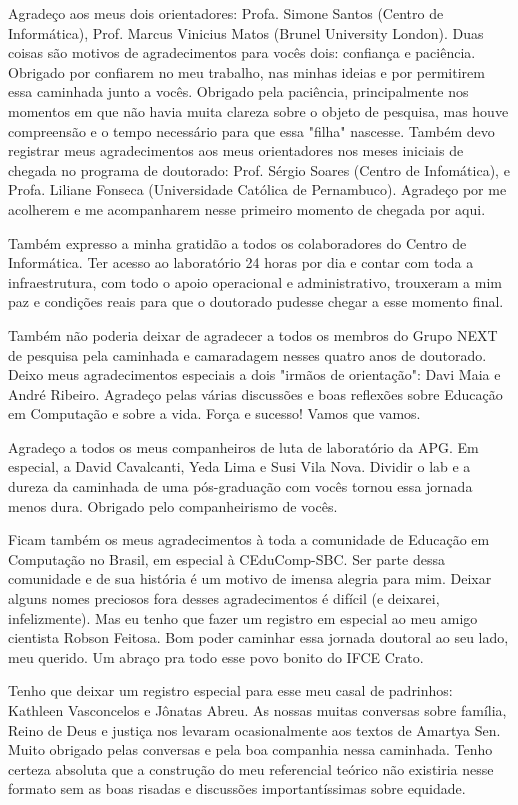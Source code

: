 \begin{agradecimentos}
Agradeço aos meus dois orientadores: Profa. Simone Santos (Centro de Informática), Prof. Marcus Vinicius Matos (Brunel University London). Duas coisas são motivos de agradecimentos para vocês dois: confiança e paciência. Obrigado por confiarem no meu trabalho, nas minhas ideias e por permitirem essa caminhada junto a vocês. Obrigado pela paciência, principalmente nos momentos em que não havia muita clareza sobre o objeto de pesquisa, mas houve compreensão e o tempo necessário para que essa "filha" nascesse. Também devo registrar meus agradecimentos aos meus orientadores nos meses iniciais de chegada no programa de doutorado:  Prof. Sérgio Soares (Centro de Infomática), e Profa. Liliane Fonseca (Universidade Católica de Pernambuco). Agradeço por me acolherem e me acompanharem nesse primeiro momento de chegada por aqui.

Também expresso a minha gratidão a todos os colaboradores do Centro de Informática. 
Ter acesso ao laboratório 24 horas por dia e contar com toda a infraestrutura, com todo o apoio operacional e administrativo, trouxeram a mim paz e condições reais para que o doutorado pudesse chegar a esse momento final.

Também não poderia deixar de agradecer a todos os membros do Grupo NEXT de pesquisa pela caminhada e camaradagem nesses quatro anos de doutorado. Deixo meus agradecimentos especiais a dois "irmãos de orientação": Davi Maia e André Ribeiro. Agradeço pelas várias discussões e boas reflexões sobre Educação em Computação e sobre a vida. Força e sucesso! Vamos que vamos.

Agradeço a todos os meus companheiros de luta de laboratório da APG. Em especial, a David Cavalcanti, Yeda Lima e Susi Vila Nova. Dividir o lab e a dureza da caminhada de uma pós-graduação com vocês tornou essa jornada menos dura. Obrigado pelo companheirismo de vocês.

Ficam também os meus agradecimentos à toda a comunidade de Educação em Computação no Brasil, em especial à CEduComp-SBC. Ser parte dessa comunidade e de sua história é um motivo de imensa alegria para mim. Deixar alguns nomes preciosos fora desses agradecimentos é difícil (e deixarei, infelizmente). Mas eu tenho que fazer um registro em especial ao meu amigo cientista Robson Feitosa. Bom poder caminhar essa jornada doutoral ao seu lado, meu querido. Um abraço pra todo esse povo bonito do IFCE Crato.

Tenho que deixar um registro especial para esse meu casal de padrinhos: Kathleen Vasconcelos e Jônatas Abreu. As nossas muitas conversas sobre família, Reino de Deus e justiça nos levaram ocasionalmente aos textos de Amartya Sen. Muito obrigado pelas conversas e pela boa compa\-nhia nessa caminhada. Tenho certeza absoluta que a construção do meu referencial teórico não existiria nesse formato sem as boas risadas e discussões importantíssimas sobre equidade.


\end{agradecimentos}
